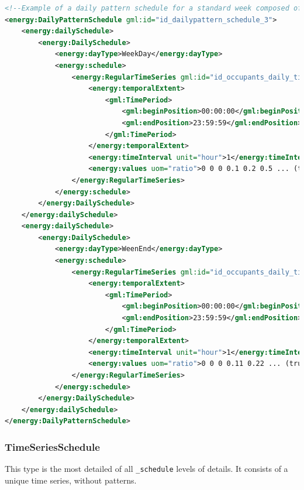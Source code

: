 \documentclass[a4paper,12pt]{article}
\begin{document}
\begin{lstlisting}[language=XML]
<!--Example of a daily pattern schedule for a standard week composed of weekday and weekend days-->
<energy:DailyPatternSchedule gml:id="id_dailypattern_schedule_3">
    <energy:dailySchedule>
        <energy:DailySchedule>
            <energy:dayType>WeekDay</energy:dayType>
            <energy:schedule>
                <energy:RegularTimeSeries gml:id="id_occupants_daily_timeseries_1">
                    <energy:temporalExtent>
                        <gml:TimePeriod>
                            <gml:beginPosition>00:00:00</gml:beginPosition>
                            <gml:endPosition>23:59:59</gml:endPosition>
                        </gml:TimePeriod>
                    </energy:temporalExtent>
                    <energy:timeInterval unit="hour">1</energy:timeInterval>
                    <energy:values uom="ratio">0 0 0 0.1 0.2 0.5 ... (truncated, set of 24 values)</energy:values>
                </energy:RegularTimeSeries>
            </energy:schedule>
        </energy:DailySchedule>
    </energy:dailySchedule>
    <energy:dailySchedule>
        <energy:DailySchedule>
            <energy:dayType>WeenEnd</energy:dayType>
            <energy:schedule>
                <energy:RegularTimeSeries gml:id="id_occupants_daily_timeseries2">
                    <energy:temporalExtent>
                        <gml:TimePeriod>
                            <gml:beginPosition>00:00:00</gml:beginPosition>
                            <gml:endPosition>23:59:59</gml:endPosition>
                        </gml:TimePeriod>
                    </energy:temporalExtent>
                    <energy:timeInterval unit="hour">1</energy:timeInterval>
                    <energy:values uom="ratio">0 0 0 0.11 0.22 ... (truncated, set of 24 values)</energy:values>
                </energy:RegularTimeSeries>
            </energy:schedule>
        </energy:DailySchedule>
    </energy:dailySchedule>
</energy:DailyPatternSchedule>
\end{lstlisting}

\subsubsection{TimeSeriesSchedule}\label{timeseriesschedule}

This type is the most detailed of all \lstinline!_schedule! levels of
details. It consists of a unique time series, without patterns.
\end{document}
